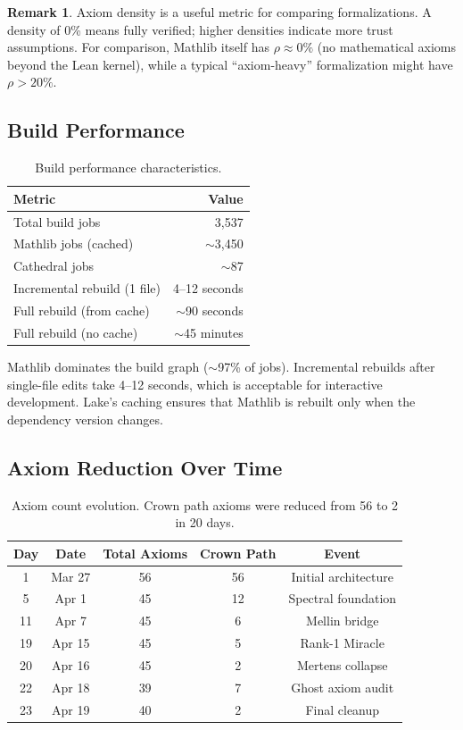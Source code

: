 \documentclass[11pt,a4paper]{article}
\theoremstyle{definition}
\newtheorem{remark}[definition]{Remark}
\begin{document}
\begin{remark}
Axiom density is a useful metric for comparing formalizations. A
density of 0\% means fully verified; higher densities indicate more
trust assumptions. For comparison, Mathlib itself has $\rho \approx 0\%$
(no mathematical axioms beyond the Lean kernel), while a typical
``axiom-heavy'' formalization might have $\rho > 20\%$.
\end{remark}

\subsection{Build Performance}

\begin{table}[h]
\centering
\begin{tabular}{@{}lr@{}}
\toprule
\textbf{Metric} & \textbf{Value} \\
\midrule
Total build jobs & 3,537 \\
Mathlib jobs (cached) & $\sim$3,450 \\
Cathedral jobs & $\sim$87 \\
Incremental rebuild (1 file) & 4--12 seconds \\
Full rebuild (from cache) & $\sim$90 seconds \\
Full rebuild (no cache) & $\sim$45 minutes \\
\bottomrule
\end{tabular}
\caption{Build performance characteristics.}
\label{tab:build}
\end{table}

Mathlib dominates the build graph ($\sim$97\% of jobs). Incremental
rebuilds after single-file edits take 4--12 seconds, which is
acceptable for interactive development. Lake's caching ensures that
Mathlib is rebuilt only when the dependency version changes.

\subsection{Axiom Reduction Over Time}

\begin{table}[h]
\centering
\begin{tabular}{@{}ccccc@{}}
\toprule
\textbf{Day} & \textbf{Date} & \textbf{Total Axioms} & \textbf{Crown Path} & \textbf{Event} \\
\midrule
1 & Mar 27 & 56 & 56 & Initial architecture \\
5 & Apr 1 & 45 & 12 & Spectral foundation \\
11 & Apr 7 & 45 & 6 & Mellin bridge \\
19 & Apr 15 & 45 & 5 & Rank-1 Miracle \\
20 & Apr 16 & 45 & 2 & Mertens collapse \\
22 & Apr 18 & 39 & 7 & Ghost axiom audit \\
23 & Apr 19 & 40 & 2 & Final cleanup \\
\bottomrule
\end{tabular}
\caption{Axiom count evolution. Crown path axioms were reduced
from 56 to 2 in 20 days.}
\label{tab:axiom-history}
\end{table}
\end{document}

